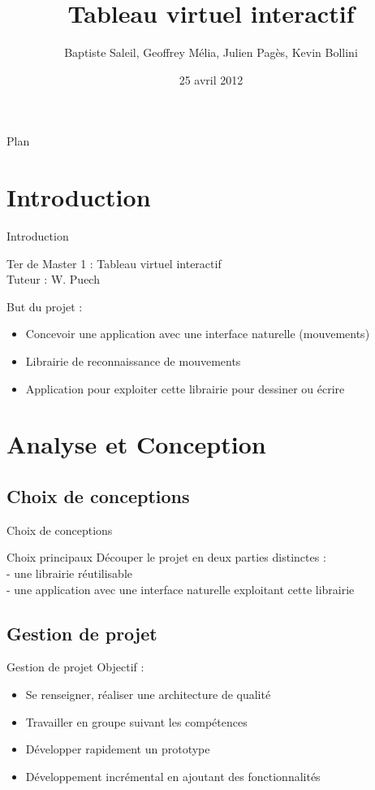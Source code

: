 \documentclass{beamer}
\title{Tableau virtuel interactif}
\author{Baptiste Saleil, Geoffrey Mélia, Julien Pagès, Kevin Bollini}
\date{25 avril 2012}
\begin{document}
	\begin{frame}
		\titlepage
	\end{frame}

	\begin{frame}{Plan}
		\tableofcontents
	\end{frame}

	\section{Introduction}
		\begin{frame}{Introduction}
		\begin{center}
		\LARGE{Ter de Master 1 : Tableau virtuel interactif} \\
		\large{Tuteur : W. Puech}
		\end{center}
		
		But du projet :
		\begin{itemize}
		\item Concevoir une application avec une interface naturelle (mouvements)
		\item Librairie de reconnaissance de mouvements
		\item Application pour exploiter cette librairie pour dessiner ou écrire
		\end{itemize}
		
		\end{frame}
		
	\section{Analyse et Conception}
	\subsection{Choix de conceptions}
		\begin{frame}{Choix de conceptions}
			\begin{block}{Choix principaux}
				Découper le projet en deux parties distinctes : \\
				- une librairie réutilisable \\
				- une application avec une interface naturelle exploitant cette librairie \\
			\end{block}
		\end{frame}
		
	\subsection{Gestion de projet}
		\begin{frame}{Gestion de projet}
			Objectif :
			\begin{itemize}
			\item Se renseigner, réaliser une architecture de qualité
			\item Travailler en groupe suivant les compétences
			\item Développer rapidement un prototype
			\item Développement incrémental en ajoutant des fonctionnalités
			\end{itemize} 
		\end{frame}
		
\end{document}
